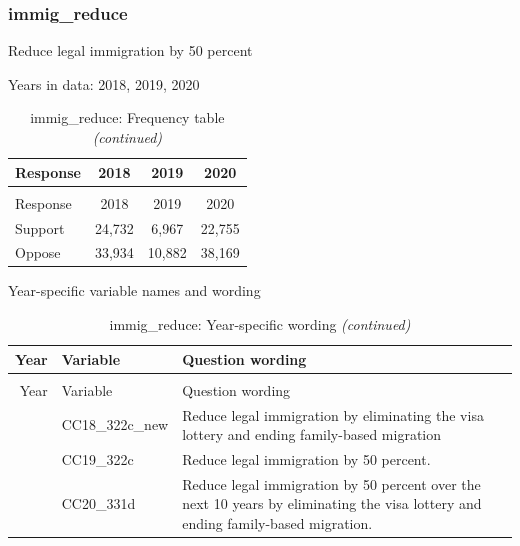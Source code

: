 \documentclass[
  12pt]{article}
\begin{document}
\hypertarget{immig_reduce}{%
\subsubsection{immig\_reduce}\label{immig_reduce}}

Reduce legal immigration by 50 percent

Years in data: 2018, 2019, 2020\begingroup\fontsize{10}{12}\selectfont

\begin{longtable}[t]{lccc}
\caption{\label{tab:unnamed-chunk-5}immig\_reduce: Frequency table}\\
\toprule
Response & 2018 & 2019 & 2020\\
\midrule
\endfirsthead
\caption[]{immig\_reduce: Frequency table \textit{(continued)}}\\
\toprule
Response & 2018 & 2019 & 2020\\
\midrule
\endhead

\endfoot
\bottomrule
\endlastfoot
Support & 24,732 & 6,967 & 22,755\\
Oppose & 33,934 & 10,882 & 38,169\\*
\end{longtable}
\endgroup{}

Year-specific variable names and
wording\begingroup\fontsize{11}{13}\selectfont

\begin{longtable}[t]{rl>{\raggedright\arraybackslash}p{10cm}}
\caption{\label{tab:unnamed-chunk-5}immig\_reduce: Year-specific wording}\\
\toprule
Year & Variable & Question wording\\
\midrule
\endfirsthead
\caption[]{immig\_reduce: Year-specific wording \textit{(continued)}}\\
\toprule
Year & Variable & Question wording\\
\midrule
\endhead

\endfoot
\bottomrule
\endlastfoot
2018 & CC18\_322c\_new & Reduce legal immigration by eliminating the visa lottery and ending family-based migration\\
\addlinespace
2019 & CC19\_322c & Reduce legal immigration by 50 percent.\\
\addlinespace
2020 & CC20\_331d & Reduce legal immigration by 50 percent over the next 10 years by eliminating the visa lottery and ending family-based migration.\\*
\end{longtable}
\endgroup{}
\end{document}
